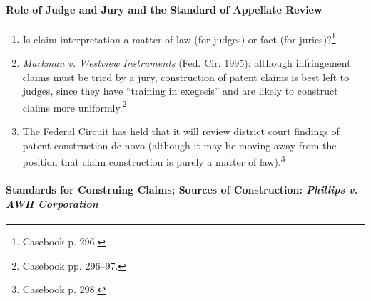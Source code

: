 \paragraph{Role of Judge and Jury and the Standard of Appellate Review}

\begin{enumerate}
    \item Is claim interpretation a matter of law (for judges) or fact (for 
    juries)?\footnote{Casebook p. 296.}
    \item \emph{Markman v. Westview Instruments} (Fed. Cir. 1995): although 
    infringement claims must be tried by a jury, construction of patent claims 
    is best left to judges, since they have ``training in exegesis'' and are 
    likely to construct claims more uniformly.\footnote{Casebook pp. 296--97.}
    \item The Federal Circuit has held that it will review district court 
    findings of patent construction de novo (although it may be moving away from 
    the position that claim construction is purely a matter of 
    law).\footnote{Casebook p. 298.}
\end{enumerate}

\paragraph{Standards for Construing Claims; Sources of Construction: 
\emph{Phillips v. AWH Corporation}}

